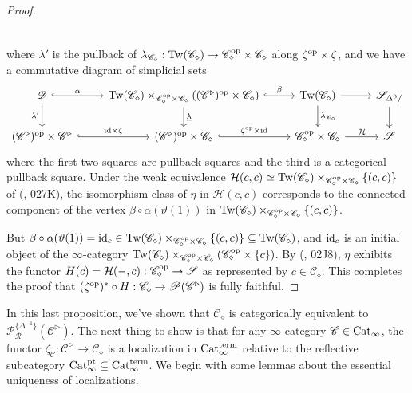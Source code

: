 \documentclass{tac}
\newcommand{\s}[1]{\mathscr{#1}}
\renewcommand{\c}[1]{\mathcal{#1}}
\newcommand{\tx}[1]{\textnormal{#1}}
\newcommand{\ul}[1]{\underline{#1}}
\begin{document}
\begin{proof}
\[\begin{tikzcd}
\end{tikzcd}\]
where $\lambda'$ is the pullback of $\lambda_{\s{C}_\diamond }: \tx{Tw}(\s{C}_\diamond ) \to \s{C}_\diamond^\tx{op} \times \s{C}_\diamond$ along $\zeta^\tx{op} \times \zeta$, and we have a commutative diagram of simplicial sets
\[\begin{tikzcd}
\s{D}\arrow[]{d}[swap]{\lambda'} \arrow[hook]{r}{\alpha} &  \tx{Tw}(\s{C}_\diamond) \times_{ \s{C}_\diamond^\tx{op} \times \s{C}_\diamond} (  (\s{C}^\triangleright )^\tx{op} \times \s{C}_\diamond ) \arrow[hook]{r}{\beta} \arrow[]{d}{\ul{\lambda}} &  \tx{Tw}(\s{C}_\diamond) \arrow[]{d}{\lambda_{\s{C}_\diamond}} \arrow[]{r} & \s{S}_{\Delta^0 /} \arrow[]{d} \\
 (\s{C}^\triangleright )^\tx{op} \times \s{C}^\triangleright \arrow[hook]{r}{\tx{id} \times \zeta} &  (\s{C}^\triangleright )^\tx{op} \times \s{C}_\diamond \arrow[hook]{r}{ \zeta^\tx{op} \times \tx{id}} &  \s{C}_\diamond^\tx{op} \times \s{C}_\diamond \arrow[]{r}{\c{H}}& \s{S}
\end{tikzcd}\]
where the first two squares are pullback squares and the third is a categorical pullback square.  Under the weak equivalence $\c{H}(c,c) \simeq \tx{Tw}(\s{C}_\diamond ) \times_{\s{C}_\diamond^\tx{op} \times \s{C}_\diamond} \{ (c,c) \}$ of (\cite{kerodon}, 027K), the isomorphism class of $\eta$ in $\c{H}(c,c)$ corresponds to the connected component of the vertex $\beta\circ\alpha ( \vartheta (1) )$ in $\tx{Tw}(\s{C}_\diamond ) \times_{\s{C}_\diamond^\tx{op} \times \s{C}_\diamond} \{ (c,c) \}$.  

But $\beta\circ\alpha ( \vartheta (1) ) = \tx{id}_c \in \tx{Tw}(\s{C}_\diamond ) \times_{\s{C}_\diamond^\tx{op} \times \s{C}_\diamond} \{ (c,c) \} \subseteq \tx{Tw}(\s{C}_\diamond )$, and $\tx{id}_c$ is an initial object of the $\infty$-category $\tx{Tw}(\s{C}_\diamond ) \times_{\s{C}_\diamond^\tx{op} \times \s{C}_\diamond} (\s{C}_\diamond^\tx{op} \times \{ c \})$.  By (\cite{kerodon}, 02J8),  $\eta$ exhibits the functor $H(c) = \c{H}(-,c): \s{C}_\diamond^\tx{op} \to \s{S}$ as represented by $c\in \s{C}_\diamond$.  This completes the proof that $(\zeta^\tx{op})^* \circ H : \s{C}_\diamond \to \s{P}(\s{C}^\triangleright )$ is fully faithful.
\end{proof}
In this last proposition, we've shown that $\s{C}_\diamond$ is categorically equivalent to $\s{P}^{\{ \Delta^{-1} \}}_{\s{R}}(\s{C}^\triangleright)$.  The next thing to show is that for any $\infty$-category $\s{C} \in \tx{Cat}_\infty$, the functor $\zeta_\s{C} : \s{C}^\triangleright \to \s{C}_\diamond$ is a localization in $\tx{Cat}_\infty^\tx{term}$ relative to the reflective subcategory $\tx{Cat}_\infty^\tx{pt} \subseteq \tx{Cat}_\infty^\tx{term}$.  We begin with some lemmas about the essential uniqueness of localizations.
\end{document}
